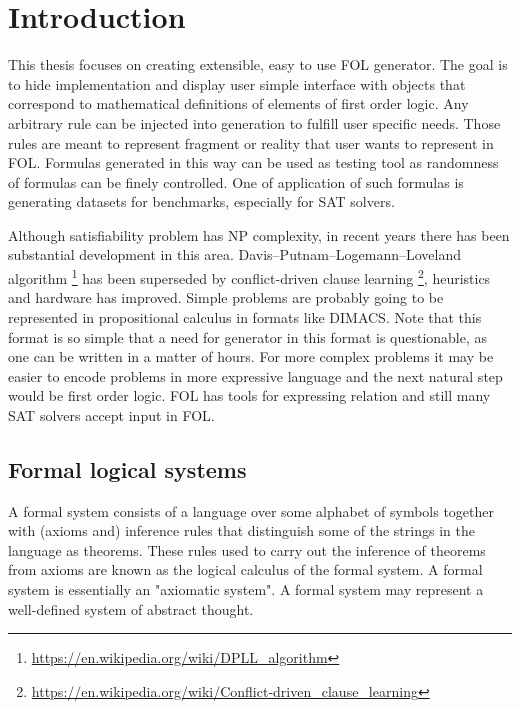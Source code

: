 \chapter{Introduction}
\label{cha:Introduction}

This thesis focuses on creating extensible, easy to use \gls{FOL} generator. The goal is to hide implementation and display user simple interface with objects that correspond to mathematical definitions of elements of first order logic. Any arbitrary rule can be injected into generation to fulfill user specific needs. Those rules are meant to represent fragment or reality that user wants to represent in \gls{FOL}. Formulas generated in this way can be used as testing tool as randomness of formulas can be finely controlled. One of application of such formulas is generating datasets for benchmarks, especially for \gls{SAT} solvers.

Although satisfiability problem has NP complexity, in recent years there has been substantial development in this area. Davis–Putnam–Logemann–Loveland algorithm \footnote{\url{https://en.wikipedia.org/wiki/DPLL_algorithm}} has been superseded by conflict-driven clause learning \footnote{\url{https://en.wikipedia.org/wiki/Conflict-driven_clause_learning}}, heuristics and hardware has improved. Simple problems are probably going to be represented in propositional calculus in formats like DIMACS. Note that this format is so simple that a need for generator in this format is questionable, as one can be written in a matter of hours. For more complex problems it may be easier to encode problems in more expressive language and the next natural step would be first order logic. \gls{FOL} has tools for expressing relation and still many SAT solvers accept input in \gls{FOL}. 


\section{Formal logical systems}

A formal system consists of a language over some alphabet of symbols together with (axioms and) inference rules that distinguish some of the strings in the language as theorems.
These rules used to carry out the inference of theorems from axioms are known as the logical calculus of the formal system. A formal system is essentially an "axiomatic system". A formal system may represent a well-defined system of abstract thought.

